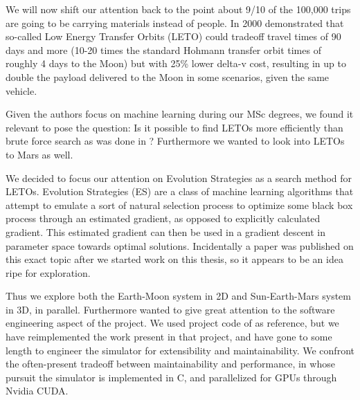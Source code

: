 We will now shift our attention back to the point about 9/10 of the 100,000 trips are going to be carrying materials instead of people. In 2000 \cite{Belbruno2000} demonstrated that so-called Low Energy Transfer Orbits (LETO) could tradeoff travel times of 90 days and more (10-20 times the standard Hohmann transfer orbit times of roughly 4 days to the Moon) but with 25\% lower delta-v cost, resulting in up to double the payload delivered to the Moon in some scenarios, given the same vehicle.

Given the authors focus on machine learning during our MSc degrees, we found it relevant to pose the question: Is it possible to find LETOs more efficiently than brute force search as was done in \cite{Saxe2015}? Furthermore we wanted to look into LETOs to Mars as well.

We decided to focus our attention on Evolution Strategies as a search method for LETOs. Evolution Strategies (ES) are a class of machine learning algorithms that attempt to emulate a sort of natural selection process to optimize some black box process through an estimated gradient, as opposed to explicitly calculated gradient. This estimated gradient can then be used in a gradient descent in parameter space towards optimal solutions. Incidentally a paper \cite{Izzo2018} was published on this exact topic after we started work on this thesis, so it appears to be an idea ripe for exploration.

Thus we explore both the Earth-Moon system in 2D and Sun-Earth-Mars system in 3D, in parallel. Furthermore wanted to give great attention to the software engineering aspect of the project. We used project code of \cite{Saxe2015} as reference, but we have reimplemented the work present in that project, and have gone to some length to engineer the simulator for extensibility and maintainability. We confront the often-present tradeoff between maintainability and performance, in whose pursuit the simulator is implemented in C, and parallelized for GPUs through Nvidia CUDA.

